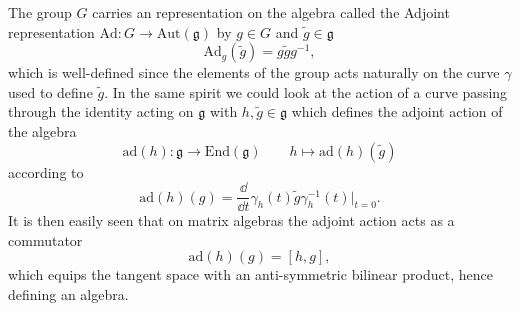 The group $G$ carries an representation on the algebra called the Adjoint representation $\text{Ad}: G\to \text{Aut}(\mathfrak{g})$ by $g\in G$ and $\tilde{g}\in\mathfrak{g}$
\begin{equation}\label{eq:Liegrouprep}
    \text{Ad}_g(\tilde{g}) = g\tilde{g}g^{-1},
\end{equation}
which is well-defined since the elements of the group acts naturally on the curve $\gamma$ used to define $\tilde{g}$. In the same spirit we could look at the action of a curve passing through the identity acting on $\mathfrak{g}$ with $h,\tilde{g}\in \mathfrak{g}$ which defines the adjoint action of the algebra 
\begin{equation}
    \text{ad}(h): \mathfrak{g}\to \text{End}(\mathfrak{g})\qquad h\mapsto \text{ad}(h)(\tilde{g})
\end{equation}
according to 
\begin{equation}
    \text{ad}(h)(g) = \frac{\dd}{\dd t}\gamma_h(t)\tilde{g}\gamma_h^{-1}(t)|_{t=0}.
\end{equation}
It is then easily seen that on matrix algebras the adjoint action acts as a commutator 
\begin{equation}
    \text{ad}(h)(g) = [h,g],
\end{equation}
which equips the tangent space with an anti-symmetric bilinear product, hence defining an algebra. 

